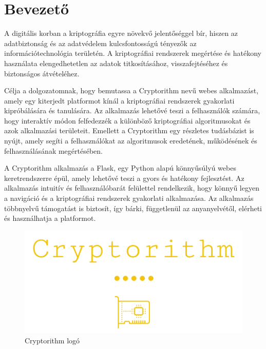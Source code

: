 \chapter{Bevezető}%

A digitális korban a kriptográfia egyre növekvő jelentőséggel bír, hiszen az adatbiztonság és az adatvédelem kulcsfontosságú tényezők az információtechnológia területén. A kriptográfiai rendszerek megértése és hatékony használata elengedhetetlen az adatok titkosításához, visszafejtéséhez és biztonságos átvételéhez.

Célja a dolgozatomnak, hogy bemutassa a Cryptorithm nevű webes alkalmazást, amely egy kiterjedt platformot kínál a kriptográfiai rendszerek gyakorlati kipróbálására és tanulására. Az alkalmazás lehetővé teszi a felhasználók számára, hogy interaktív módon felfedezzék a különböző kriptográfiai algoritmusokat és azok alkalmazási területeit. Emellett a Cryptorithm egy részletes tudásbázist is nyújt, amely segíti a felhasználókat az algoritmusok eredetének, működésének és felhasználásának megértésében.

A Cryptorithm alkalmazás a Flask, egy Python alapú könnyűsúlyú webes keretrendszerre épül, amely lehetővé teszi a gyors és hatékony fejlesztést. Az alkalmazás intuitív és felhasználóbarát felülettel rendelkezik, hogy könnyű legyen a navigáció és a kriptográfiai rendszerek gyakorlati alkalmazása. Az alkalmazás többnyelvű támogatást is biztosít, így bárki, függetlenül az anyanyelvétől, elérheti és használhatja a platformot.

\begin{figure}[!h]
	\centering
	\includegraphics[scale=0.25]{images/logoCryptorithm}
	\caption{Cryptorithm logó}
\end{figure}
\pagebreak

